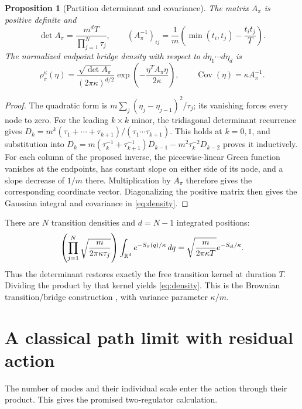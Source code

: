 \documentclass[11pt,a4paper]{article}
\newtheorem{proposition}{Proposition}
\newcommand{\R}{\mathbb R}
\begin{document}
\begin{proposition}[Partition determinant and covariance]\label{prop:partition}
The matrix $A_\pi$ is positive definite and
\begin{equation}\label{eq:detgreen}
 \det A_\pi=\frac{m^dT}{\prod_{j=1}^N\tau_j},\qquad
 (A_\pi^{-1})_{ij}=\frac1m\left(\min(t_i,t_j)-\frac{t_it_j}{T}\right).
\end{equation}
The normalized endpoint bridge density with respect to $d\eta_1\cdots d\eta_d$
is
\begin{equation}\label{eq:density}
 \rho_\pi^\kappa(\eta)=
 \frac{\sqrt{\det A_\pi}}{(2\pi\kappa)^{d/2}}
 \exp\left(-\frac{\eta^TA_\pi\eta}{2\kappa}\right),
 \qquad \operatorname{Cov}(\eta)=\kappa A_\pi^{-1}.
\end{equation}
\end{proposition}
\begin{proof}
The quadratic form is $m\sum_j(\eta_j-\eta_{j-1})^2/\tau_j$; its vanishing
forces every node to zero. For the leading $k\times k$ minor, the tridiagonal
determinant recurrence gives
$D_k=m^k(\tau_1+\cdots+\tau_{k+1})/(\tau_1\cdots\tau_{k+1})$.
This holds at $k=0,1$, and substitution into
$D_k=m(\tau_k^{-1}+\tau_{k+1}^{-1})D_{k-1}
-m^2\tau_k^{-2}D_{k-2}$ proves it inductively.
For each column of the proposed inverse, the piecewise-linear Green function
vanishes at the endpoints, has constant slope on either side of its node,
and a slope decrease of $1/m$ there. Multiplication by $A_\pi$ therefore
gives the corresponding coordinate vector. Diagonalizing the positive matrix
then gives the Gaussian integral and covariance in \eqref{eq:density}.
\end{proof}

There are $N$ transition densities and $d=N-1$ integrated positions:
\begin{equation}\label{eq:kernel}
 \left(\prod_{j=1}^N\sqrt{\frac{m}{2\pi\kappa\tau_j}}\right)
 \int_{\R^d}e^{-S_\pi(q)/\kappa}\,dq
 =\sqrt{\frac{m}{2\pi\kappa T}}e^{-S_{\rm cl}/\kappa}.
\end{equation}
Thus the determinant restores exactly the free transition kernel at duration
$T$. Dividing the product by that kernel yields \eqref{eq:density}.
This is the Brownian transition/bridge construction
\cite[\S\S3.4,4.1]{PitmanYor2018}, with variance parameter $\kappa/m$.

\section{A classical path limit with residual action}
The number of modes and their individual scale enter the action through their
product. This gives the promised two-regulator calculation.
\end{document}
